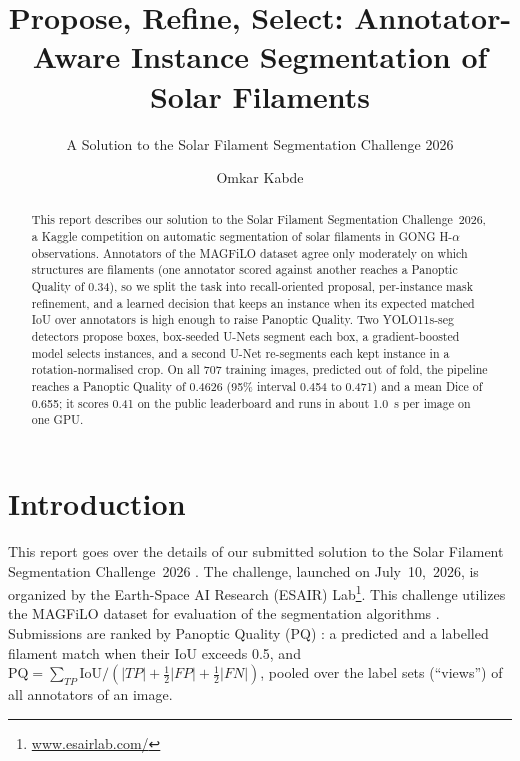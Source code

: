 \documentclass[sigconf]{acmart}
\begin{document}
\title{Propose, Refine, Select: Annotator-Aware Instance Segmentation of Solar Filaments}
\subtitle{A Solution to the Solar Filament Segmentation Challenge 2026} %

\author{Omkar Kabde}

\begin{abstract}
This report describes our solution to the Solar Filament Segmentation Challenge~2026, a Kaggle competition on automatic segmentation of solar filaments in GONG H-$\alpha$ observations. Annotators of the MAGFiLO dataset agree only moderately on which structures are filaments (one annotator scored against another reaches a Panoptic Quality of 0.34), so we split the task into recall-oriented proposal, per-instance mask refinement, and a learned decision that keeps an instance when its expected matched IoU over annotators is high enough to raise Panoptic Quality. Two YOLO11s-seg detectors propose boxes, box-seeded U-Nets segment each box, a gradient-boosted model selects instances, and a second U-Net re-segments each kept instance in a rotation-normalised crop. On all 707 training images, predicted out of fold, the pipeline reaches a Panoptic Quality of 0.4626 (95\% interval 0.454 to 0.471) and a mean Dice of 0.655; it scores 0.41 on the public leaderboard and runs in about 1.0~s per image on one GPU.
\end{abstract}

\maketitle

\section{Introduction}
This report goes over the details of our submitted solution to the Solar Filament Segmentation Challenge~2026 \cite{filament-segmentation-2026}. The challenge, launched on July~10,~2026, is organized by the Earth-Space AI Research (ESAIR) Lab\footnote{\href{https://www.esairlab.com/home}{www.esairlab.com/}}. This challenge utilizes the MAGFiLO dataset for evaluation of the segmentation algorithms \cite{ahmadzadeh2024dataset}.
Submissions are ranked by Panoptic Quality (PQ) \cite{pq}: a predicted and a labelled filament match when their IoU exceeds 0.5, and $\mathrm{PQ}=\sum_{TP}\mathrm{IoU}/(|TP|+\tfrac12|FP|+\tfrac12|FN|)$, pooled over the label sets (``views'') of all annotators of an image.
\end{document}
